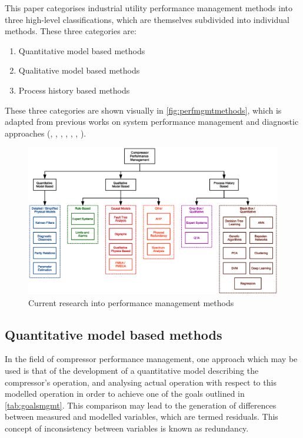 This paper categorises industrial utility performance management methods into three high-level classifications, which are themselves subdivided into individual methods. These three categories are:
\begin{enumerate}
\item Quantitative model based methods
\item Qualitative model based methods
\item Process history based methods
\end{enumerate}
These three categories are shown visually in \autoref{fig:perfmgmtmethods}, which is adapted from previous works on system performance management and diagnostic approaches (\cite{Katipamula2005}, \cite{Venkatasubramanian2003}, \cite{Venkatasubramanian2003a}, \cite{Venkatasubramanian2003b}, \cite{Gao2015}, \cite{Gao2015a}, \cite{Bruton2013}).


\begin{figure}
\includegraphics[width=\textwidth]{./Images/perfmgmt.eps}
\caption{Current research into performance management methods}
\label{fig:perfmgmtmethods}
\end{figure}

\subsection{Quantitative model based methods}
In the field of compressor performance management, one approach which may be used is that of the development of a quantitative model describing the compressor's operation, and analysing actual operation with respect to this modelled operation in order to achieve one of the goals outlined in \autoref{tab:goalsmgmt}. This comparison may lead to the generation of differences between measured and modelled variables, which are termed residuals. This concept of inconsistency between variables is known as redundancy.

